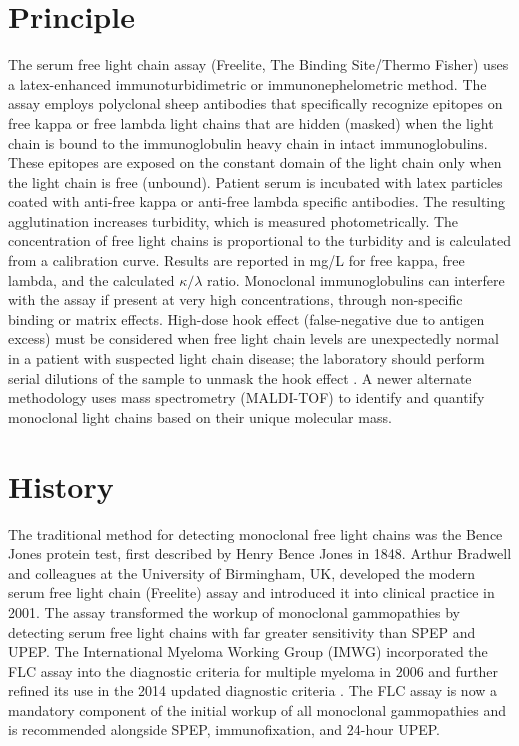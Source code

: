 \section*{Principle}
The serum free light chain assay (Freelite, The Binding Site/Thermo Fisher) uses a latex-enhanced immunoturbidimetric or immunonephelometric method. The assay employs polyclonal sheep antibodies that specifically recognize epitopes on free kappa or free lambda light chains that are hidden (masked) when the light chain is bound to the immunoglobulin heavy chain in intact immunoglobulins. These epitopes are exposed on the constant domain of the light chain only when the light chain is free (unbound). Patient serum is incubated with latex particles coated with anti-free kappa or anti-free lambda specific antibodies. The resulting agglutination increases turbidity, which is measured photometrically. The concentration of free light chains is proportional to the turbidity and is calculated from a calibration curve. Results are reported in mg/L for free kappa, free lambda, and the calculated $\kappa/\lambda$ ratio. Monoclonal immunoglobulins can interfere with the assay if present at very high concentrations, through non-specific binding or matrix effects. High-dose hook effect (false-negative due to antigen excess) must be considered when free light chain levels are unexpectedly normal in a patient with suspected light chain disease; the laboratory should perform serial dilutions of the sample to unmask the hook effect \cite{dispenzieri2009international}. A newer alternate methodology uses mass spectrometry (MALDI-TOF) to identify and quantify monoclonal light chains based on their unique molecular mass.

\section*{History}
The traditional method for detecting monoclonal free light chains was the Bence Jones protein test, first described by Henry Bence Jones in 1848. Arthur Bradwell and colleagues at the University of Birmingham, UK, developed the modern serum free light chain (Freelite) assay and introduced it into clinical practice in 2001. The assay transformed the workup of monoclonal gammopathies by detecting serum free light chains with far greater sensitivity than SPEP and UPEP. The International Myeloma Working Group (IMWG) incorporated the FLC assay into the diagnostic criteria for multiple myeloma in 2006 and further refined its use in the 2014 updated diagnostic criteria \cite{rajkumar2014international}. The FLC assay is now a mandatory component of the initial workup of all monoclonal gammopathies and is recommended alongside SPEP, immunofixation, and 24-hour UPEP.

